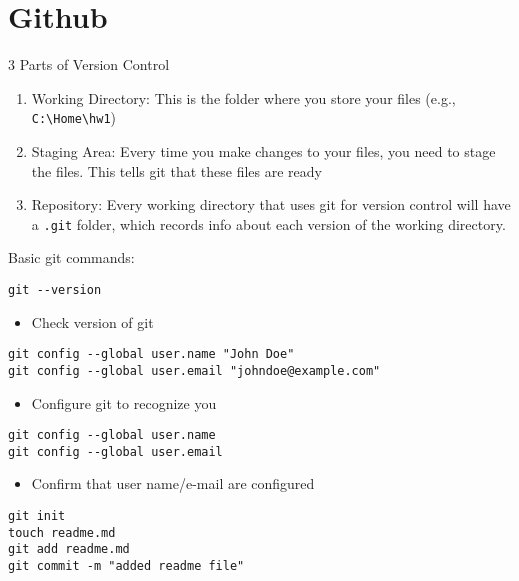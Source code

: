 \documentclass[]{book}
\providecommand{\tightlist}{%
  \setlength{\itemsep}{0pt}\setlength{\parskip}{0pt}}
\begin{document}
\hypertarget{github}{%
\section{Github}\label{github}}

3 Parts of Version Control

\begin{enumerate}
\def\labelenumi{\arabic{enumi}.}
\tightlist
\item
  Working Directory: This is the folder where you store your files (e.g., \texttt{C:\textbackslash{}Home\textbackslash{}hw1})
\item
  Staging Area: Every time you make changes to your files, you need to stage the files. This tells git that these files are ready
\item
  Repository: Every working directory that uses git for version control will have a \texttt{.git} folder, which records info about each version of the working directory.
\end{enumerate}

Basic git commands:

\begin{verbatim}
git --version
\end{verbatim}

\begin{itemize}
\tightlist
\item
  Check version of git
\end{itemize}

\begin{verbatim}
git config --global user.name "John Doe"
git config --global user.email "johndoe@example.com"
\end{verbatim}

\begin{itemize}
\tightlist
\item
  Configure git to recognize you
\end{itemize}

\begin{verbatim}
git config --global user.name
git config --global user.email
\end{verbatim}

\begin{itemize}
\tightlist
\item
  Confirm that user name/e-mail are configured
\end{itemize}

\begin{verbatim}
git init
touch readme.md
git add readme.md
git commit -m "added readme file"
\end{verbatim}
\end{document}
